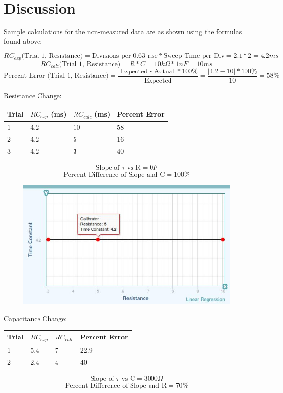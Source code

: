 \documentclass[11pt, titlepage]{article}
\begin{document}
\section*{Discussion}
Sample calculations for the non-measured data are as shown using the formulas found above:

$$RC_{exp} \text{(Trial 1, Resistance)} = \text{Divisions per 0.63 rise} * \text{Sweep Time per Div} = 2.1 * 2 = 4.2 ms$$
$$RC_{calc} \text{(Trial 1, Resistance)} = R * C = 10k \Omega * 1 nF = 10 ms$$
$$\text{Percent Error (Trial 1, Resistance)} = \frac{\text{$|$Expected - Actual$|$} * 100\%}{\text{Expected}} = \frac{|4.2 - 10| * 100\%}{10} = 58\%$$

\underline{Resistance Change:}
\begin{center}
\begin{tabular}
{|m{7em}|m{7em}|m{7em}|m{7em}|}
\hline
Trial & $RC_{exp}$ (ms) & $RC_{calc}$ (ms)& Percent Error\\
\hline
1 & 4.2 & 10 & 58\\
\hline
2 & 4.2 & 5 & 16\\
\hline
3 & 4.2 & 3 & 40\\
\hline
\end{tabular}
$$\text{Slope of $\tau$ vs R} = 0 F$$
$$\text{Percent Difference of Slope and C} = 100\%$$
\end{center}

\begin{figure}[h]
\centering
\hspace*{0cm}
\includegraphics[scale=0.8]{graph51.jpg}
\vspace*{0cm}
\end{figure}

\underline{Capacitance Change:}
\begin{center}
\begin{tabular}
{|m{7em}|m{7em}|m{7em}|m{7em}|}
\hline
Trial & $RC_{exp}$ & $RC_{calc}$ & Percent Error\\
\hline
1 & 5.4 & 7 & 22.9\\
\hline
2 & 2.4 & 4 & 40\\
\hline
\end{tabular}
$$\text{Slope of $\tau$ vs C} = 3000 \Omega$$
$$\text{Percent Difference of Slope and R} = 70\%$$
\end{center}
\end{document}
